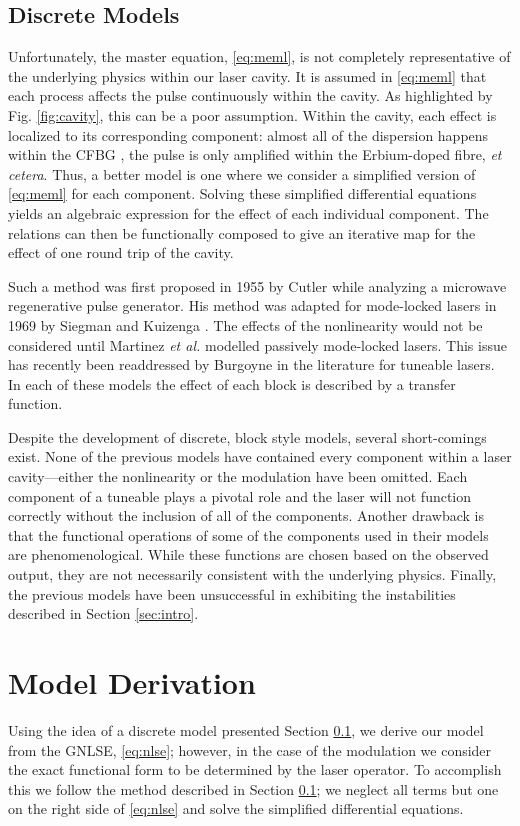 \documentclass[9pt,twocolumn,twoside]{osajnl}
\begin{document}
\subsection{Discrete Models}
\label{sec:discrete}
Unfortunately, the master equation, \eqref{eq:meml}, is not completely representative of the underlying physics within our laser cavity. It is assumed in \eqref{eq:meml} that each process affects the pulse continuously within the cavity. As highlighted by Fig. \ref{fig:cavity}, this can be a poor assumption. Within the cavity, each effect is localized to its corresponding component: almost all of the dispersion happens within the CFBG \cite{agrawal2002}, the pulse is only amplified within the Erbium-doped fibre, \emph{et cetera}. Thus, a better model is one where we consider a simplified version of \eqref{eq:meml} for each component. Solving these simplified differential equations yields an algebraic expression for the effect of each individual component. The relations can then be functionally composed to give an iterative map for the effect of one round trip of the cavity.

Such a method was first proposed in 1955 by Cutler \cite{cutler1955} while analyzing a microwave regenerative pulse generator. His method was adapted for mode-locked lasers in 1969 by Siegman and Kuizenga \cite{kuizenga1970a, kuizenga1970b, kuizenga1970, siegman1969}. The effects of the nonlinearity would not be considered until Martinez \emph{et al.} \cite{martinez1984, martinez1985} modelled passively mode-locked lasers. This issue has recently been readdressed by Burgoyne \cite{burgoyne2014} in the literature for tuneable lasers. In each of these models the effect of each block is described by a transfer function.

Despite the development of discrete, block style models, several short-comings exist. None of the previous models have contained every component within a laser cavity---either the nonlinearity or the modulation have been omitted. Each component of a tuneable plays a pivotal role and the laser will not function correctly without the inclusion of all of the components. Another drawback is that the functional operations of some of the components used in their models are phenomenological. While these functions are chosen based on the observed output, they are not necessarily consistent with the underlying physics. Finally, the previous models have been unsuccessful in exhibiting the instabilities described in Section \ref{sec:intro}.

\section{Model Derivation}
\label{sec:model}
Using the idea of a discrete model presented Section \ref{sec:discrete}, we derive our model from the GNLSE, \eqref{eq:nlse}; however, in the case of the modulation we consider the exact functional form to be determined by the laser operator. To accomplish this we follow the method described in Section \ref{sec:discrete}; we neglect all terms but one on the right side of \eqref{eq:nlse} and solve the simplified differential equations.
\end{document}
